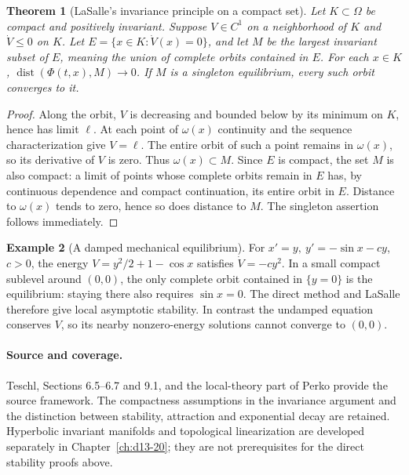 \documentclass[11pt,oneside]{book}
\newtheorem{theorem}{Theorem}[chapter]
\theoremstyle{definition}
\newtheorem{example}[theorem]{Example}
\theoremstyle{remark}\newtheorem{remark}[theorem]{Remark}
\begin{document}
\begin{theorem}[LaSalle's invariance principle on a compact set]\label{d13:12:lasalle}
Let \(K\subset\Omega\) be compact and positively invariant.
Suppose \(V\in C^1\) on a neighborhood of \(K\) and \(\dot V\le0\) on \(K\).
Let \(E=\{x\in K:\dot V(x)=0\}\), and let \(M\) be the largest invariant
subset of \(E\), meaning the union of complete orbits contained in \(E\).
For each \(x\in K\),
\(\operatorname{dist}(\Phi(t,x),M)\to0\).
If \(M\) is a singleton equilibrium, every such orbit converges to it.
\end{theorem}
\begin{proof}
Along the orbit, \(V\) is decreasing and bounded below by its minimum
on \(K\), hence has limit \(\ell\). At each point of \(\omega(x)\)
continuity and the sequence characterization give \(V=\ell\).
The entire orbit of such a point remains in \(\omega(x)\), so its
derivative of \(V\) is zero. Thus \(\omega(x)\subset M\).
Since \(E\) is compact, the set \(M\) is also compact: a limit of points
whose complete orbits remain in \(E\) has, by continuous dependence
and compact continuation, its entire orbit in \(E\).
Distance to \(\omega(x)\) tends to zero, hence so does distance to \(M\).
The singleton assertion follows immediately.
\end{proof}

\begin{example}[A damped mechanical equilibrium]\label{d13:12:damped-pendulum}
For \(x'=y,\ y'=-\sin x-cy\), \(c>0\), the energy
\(V=y^2/2+1-\cos x\) satisfies \(\dot V=-cy^2\).
In a small compact sublevel around \((0,0)\), the only complete orbit
contained in \(\{y=0\}\) is the equilibrium: staying there also requires
\(\sin x=0\). The direct method and LaSalle therefore give local
asymptotic stability. In contrast the undamped equation conserves \(V\),
so its nearby nonzero-energy solutions cannot converge to \((0,0)\).
\end{example}

\paragraph{Source and coverage.}
Teschl, Sections 6.5--6.7 and 9.1, and the local-theory part of Perko
provide the source framework. The compactness assumptions in the
invariance argument and the distinction between stability, attraction
and exponential decay are retained. Hyperbolic invariant manifolds
and topological linearization are developed separately in
Chapter~\ref{ch:d13-20}; they are not prerequisites for the direct
stability proofs above.
\end{document}
